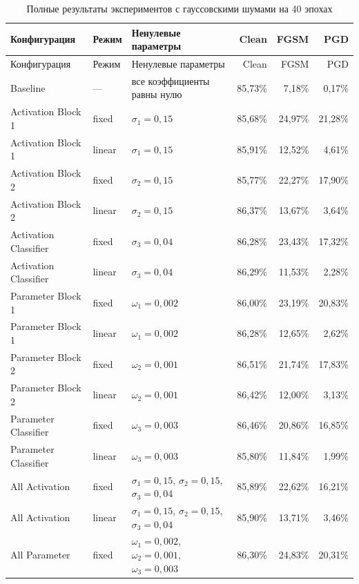 \documentclass[a4paper]{article}
\begin{document}
\footnotesize
\begin{longtable}{p{3.1cm}p{1.2cm}p{4.1cm}rrr}
\caption{Полные результаты экспериментов с гауссовскими шумами на 40 эпохах}\label{tab:all-gaussian}\\
\toprule
Конфигурация & Режим & Ненулевые параметры & Clean & FGSM & PGD\\
\midrule
\endfirsthead
\toprule
Конфигурация & Режим & Ненулевые параметры & Clean & FGSM & PGD\\
\midrule
\endhead
Baseline & --- & все коэффициенты равны нулю & 85{,}73\% & 7{,}18\% & 0{,}17\%\\
Activation Block 1 & fixed & $\sigma_1=0{,}15$ & 85{,}68\% & 24{,}97\% & 21{,}28\%\\
Activation Block 1 & linear & $\sigma_1=0{,}15$ & 85{,}91\% & 12{,}52\% & 4{,}61\%\\
Activation Block 2 & fixed & $\sigma_2=0{,}15$ & 85{,}77\% & 22{,}27\% & 17{,}90\%\\
Activation Block 2 & linear & $\sigma_2=0{,}15$ & 86{,}37\% & 13{,}67\% & 3{,}64\%\\
Activation Classifier & fixed & $\sigma_3=0{,}04$ & 86{,}28\% & 23{,}43\% & 17{,}32\%\\
Activation Classifier & linear & $\sigma_3=0{,}04$ & 86{,}29\% & 11{,}53\% & 2{,}28\%\\
Parameter Block 1 & fixed & $\omega_1=0{,}002$ & 86{,}00\% & 23{,}19\% & 20{,}83\%\\
Parameter Block 1 & linear & $\omega_1=0{,}002$ & 86{,}28\% & 12{,}65\% & 2{,}62\%\\
Parameter Block 2 & fixed & $\omega_2=0{,}001$ & 86{,}51\% & 21{,}74\% & 17{,}83\%\\
Parameter Block 2 & linear & $\omega_2=0{,}001$ & 86{,}42\% & 12{,}00\% & 3{,}13\%\\
Parameter Classifier & fixed & $\omega_3=0{,}003$ & 86{,}46\% & 20{,}86\% & 16{,}85\%\\
Parameter Classifier & linear & $\omega_3=0{,}003$ & 85{,}80\% & 11{,}84\% & 1{,}99\%\\
All Activation & fixed & $\sigma_1=0{,}15$, $\sigma_2=0{,}15$, $\sigma_3=0{,}04$ & 85{,}89\% & 22{,}62\% & 16{,}21\%\\
All Activation & linear & $\sigma_1=0{,}15$, $\sigma_2=0{,}15$, $\sigma_3=0{,}04$ & 85{,}90\% & 13{,}71\% & 3{,}46\%\\
All Parameter & fixed & $\omega_1=0{,}002$, $\omega_2=0{,}001$, $\omega_3=0{,}003$ & 86{,}30\% & 24{,}83\% & 20{,}31\%\\

\end{longtable}
\end{document}
